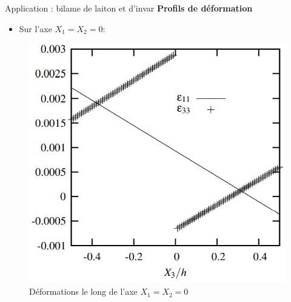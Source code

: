 \begin{frame}{Application : bilame de laiton et d'invar}
    \textbf{\Large{Profils de déformation}}
    
    \begin{itemize}
        \item Sur l'axe $X_1=X_2=0$:
    \end{itemize}
    \begin{figure}
        \centering
        \includegraphics[scale=0.5]{imgs/graph2.jpg}
        \caption{Déformations le long de l'axe $X_1=X_2=0$}
    \end{figure}
\end{frame}

